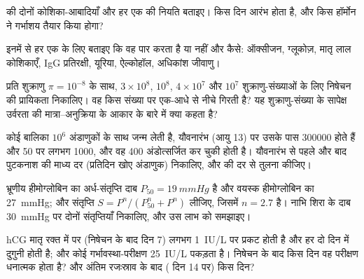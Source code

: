 \begin{exercise}[$\star$]\label{exo:b2:mammal-reproduction:3}
 की दोनों कोशिका-आबादियाँ और हर एक की नियति
बताइए।  किस दिन आरंभ होता है, और किस हॉर्मोन ने गर्भाशय
तैयार किया होगा?
\end{exercise}

\begin{exercise}[$\star$]\label{exo:b2:mammal-reproduction:4}
इनमें से हर एक के लिए बताइए कि वह  पार करता है या नहीं और
कैसे: ऑक्सीजन, ग्लूकोज़, मातृ लाल कोशिकाएँ, IgG प्रतिरक्षी, यूरिया,
ऐल्कोहॉल, अधिकांश जीवाणु।
\end{exercise}

\begin{exercise}[$\star\star$]\label{exo:b2:mammal-reproduction:5}
प्रति शुक्राणु $\pi = 10^{-8}$ के साथ, $3\times 10^{8}$, $10^{8}$,
$4\times 10^{7}$ और $10^{7}$ शुक्राणु-संख्याओं के लिए निषेचन की
प्रायिकता निकालिए। वह किस संख्या पर एक-आधे से
नीचे गिरती है? यह शुक्राणु-संख्या के सापेक्ष उर्वरता की मात्रा--अनुक्रिया
के आकार के बारे में क्या कहता है?
\end{exercise}

\begin{exercise}[$\star\star$]\label{exo:b2:mammal-reproduction:6}
कोई बालिका $10^{6}$ अंडाणुकों के साथ जन्म लेती है, यौवनारंभ (आयु 13) पर
उसके पास \num{300000} होते हैं और 50 पर लगभग \num{1000}, और वह \num{400}
अंडोत्सर्जित कर चुकी होती है। यौवनारंभ से पहले और बाद पुटकनाश की माध्य दर
(प्रतिदिन खोए अंडाणुक) निकालिए, और  की दर से तुलना कीजिए।
\end{exercise}

\begin{exercise}[$\star\star$]\label{exo:b2:mammal-reproduction:7}
भ्रूणीय हीमोग्लोबिन का अर्ध-संतृप्ति दाब $P_{50} =
\qty{19}{mmHg}$ है और वयस्क हीमोग्लोबिन का \qty{27}{mmHg}; और संतृप्ति
$S = P^{n}/(P_{50}^{n} + P^{n})$ लीजिए, जिसमें $n = 2.7$ है।
नाभि शिरा के दाब \qty{30}{mmHg} पर दोनों संतृप्तियाँ
निकालिए, और उस लाभ को समझाइए।
\end{exercise}

\begin{exercise}[$\star\star$]\label{exo:b2:mammal-reproduction:8}
hCG मातृ रक्त में  पर (निषेचन के बाद दिन 7)
लगभग \qty{1}{IU/L} पर प्रकट होती है और हर दो दिन में दुगुनी होती है; और
कोई गर्भावस्था-परीक्षण \qty{25}{IU/L} पकड़ता है। निषेचन के बाद किस दिन
वह परीक्षण धनात्मक होता है? और अंतिम रजःस्राव के बाद
( दिन 14 पर) किस दिन?
\end{exercise}

